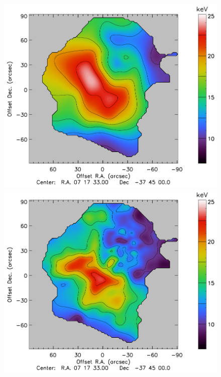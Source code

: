 \documentclass[twocolumn,traditabstract]{aa}
\begin{document}
\begin{figure}[h]
\centering
\includegraphics[trim=0cm 0cm 2.3cm 0cm, clip=true, totalheight=6.1cm]{Figure/Thermo_TCXO.pdf}
\includegraphics[trim=1.6cm 0cm 2.3cm 0cm, clip=true, totalheight=6.1cm]{Figure/Thermo_TXMM.pdf}

\end{figure}
\end{document}
